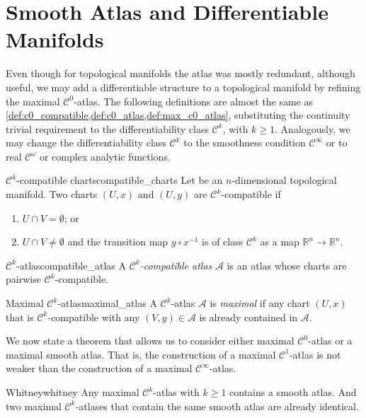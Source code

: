 \section{Smooth Atlas and Differentiable Manifolds}

Even though for topological manifolds the atlas was mostly redundant, although useful, we may add a differentiable structure to a topological manifold by refining the maximal \(\mathcal{C}^0\)-atlas. The following definitions are almost the same as \cref{def:c0_compatible,def:c0_atlas,def:max_c0_atlas}, substituting the continuity trivial requirement to the differentiability class \(\mathcal{C}^k\), with \(k \geq 1\). Analogously, we may change the differentiability class \(\mathcal{C}^k\) to the smoothness condition \(\mathcal{C}^\infty\) or to real \(\mathcal{C}^\omega\) or complex analytic functions.

\begin{definition}{\(\mathcal{C}^k\)-compatible charts}{compatible_charts}
    Let  be an \(n\)-dimensional topological manifold. Two charts \((U, x)\) and \((U, y)\) are \(\mathcal{C}^k\)-compatible if
    \begin{enumerate}[label=(\alph*)]
        \item \(U \cap V = \emptyset\); or
        \item \(U \cap V \neq \emptyset\) and the transition map \(y \circ x^{-1}\) is of class \(\mathcal{C}^k\) as a map \(\mathbb{R}^n \to \mathbb{R}^n\).
    \end{enumerate}
\end{definition}

\begin{definition}{\(\mathcal{C}^k\)-atlas}{compatible_atlas}
    A \emph{\(\mathcal{C}^k\)-compatible atlas} \(\mathscr{A}\) is an atlas whose charts are pairwise \(\mathcal{C}^k\)-compatible.
\end{definition}

\begin{definition}{Maximal \(\mathcal{C}^k\)-atlas}{maximal_atlas}
    A \(\mathcal{C}^k\)-atlas \(\mathscr{A}\) is \emph{maximal} if any chart \((U, x)\) that is \(\mathcal{C}^k\)-compatible with any \((V, y) \in \mathscr{A}\) is already contained in \(\mathscr{A}\).
\end{definition}

We now state a theorem \cite{hirsch} that allows us to consider either maximal \(\mathcal{C}^0\)-atlas or a maximal smooth atlas. That is, the construction of a maximal \(\mathcal{C}^1\)-atlas is not weaker than the construction of a maximal \(\mathcal{C}^\infty\)-atlas.
\begin{theorem}{Whitney}{whitney}
    Any maximal \(\mathcal{C}^k\)-atlas with \(k \geq 1\) contains a smooth atlas. And two maximal \(\mathcal{C}^k\)-atlases that contain the same smooth atlas are already identical.
\end{theorem}

